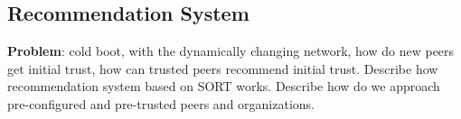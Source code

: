 \subsection{Recommendation System}
\textbf{Problem}: cold boot, with the dynamically changing network, how do new peers get initial trust, how can trusted peers recommend initial trust. Describe how recommendation system based on SORT works. Describe how do we approach pre-configured and pre-trusted peers and organizations.